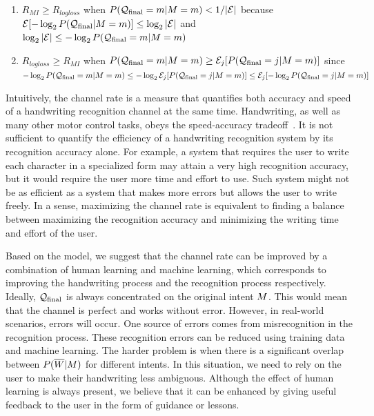 \documentclass{sigchi}
\begin{document}
\begin{enumerate}
\item $R_{MI} \ge R_{logloss}$ when $P(\mathcal{Q}_{\mathrm{final}} = m | M =m) < 1/|\mathcal{E}|$ 
because $\mathcal{E}[-\log_2 P(\mathcal{Q}_{\mathrm{final}} | M = m)] \le \log_2
|\mathcal{E}|$ and $\log_2 |\mathcal{E}| \le -\log_2 P(\mathcal{Q}_{\mathrm{final}} = m |
M = m)$\\
\item $R_{logloss} \ge R_{MI}$ when $P(\mathcal{Q}_{\mathrm{final}} = m | M =m)
  \ge \mathcal{E}_j[P(\mathcal{Q}_{\mathrm{final}} = j | M = m)]$ since $-\log_2
  P(\mathcal{Q}_{\mathrm{final}} = m | M =m) \le -\log_2
  \mathcal{E}_j[P(\mathcal{Q}_{\mathrm{final}} = j | M = m)] \le \mathcal{E}_j[
  -\log_2 P(\mathcal{Q}_{\mathrm{final}} = j | M = m)]$ 
\end{enumerate}

Intuitively, the channel rate is a measure that quantifies both
accuracy and speed of a handwriting recognition channel at the same
time. Handwriting, as well as many other motor control tasks, obeys
the speed-accuracy tradeoff~\cite{Fitts1954}. It is not sufficient to
quantify the efficiency of a handwriting recognition system by its
recognition accuracy alone. For example, a system that requires the
user to write each character in a specialized form may attain a very
high recognition accuracy, but it would require the user more time and
effort to use. Such system might not be as efficient as a system that
makes more errors but allows the user to write freely. In a sense,
maximizing the channel rate is equivalent to finding a balance between
maximizing the recognition accuracy and minimizing the writing time
and effort of the user.

Based on the model, we suggest that the channel rate can be improved
by a combination of human learning and machine learning, which
corresponds to improving the handwriting process and the recognition
process respectively. Ideally, $\mathcal{Q}_{\mathrm{final}}$ is always concentrated
on the original intent $M$. This would mean that the channel is
perfect and works without error. However, in real-world scenarios,
errors will occur. One source of errors comes from misrecognition in
the recognition process. These recognition errors can be reduced using
training data and machine learning. The harder problem is when there
is a significant overlap between $P(\overline{W} | M)$ for different
intents. In this situation, we need to rely on the user to make
their handwriting less ambiguous. Although the effect of human
learning is always present, we believe that it can be enhanced by
giving useful feedback to the user in the form of guidance or lessons.
\end{document}
